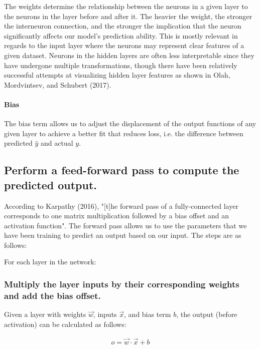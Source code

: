 \documentclass[11pt]{article}
\begin{document}
The weights determine the relationship between the neurons in a given
layer to the neurons in the layer before and after it. The heavier the
weight, the stronger the interneuron connection, and the stronger the
implication that the neuron significantly affects our model's prediction
ability. This is mostly relevant in regards to the input layer where the
neurons may represent clear features of a given dataset. Neurons in the
hidden layers are often less interpretable since they have undergone
multiple transformations, though there have been relatively successful
attempts at visualizing hidden layer features as shown in Olah,
Mordvintsev, and Schubert (2017).

\paragraph{Bias}\label{bias}

The bias term allows us to adjust the displacement of the output
functions of any given layer to achieve a better fit that reduces loss,
i.e. the difference between predicted \(\hat{y}\) and actual \(y\).

    \subsection{Perform a feed-forward pass to compute the predicted
output.}\label{perform-a-feed-forward-pass-to-compute-the-predicted-output.}

According to Karpathy (2016), "{[}t{]}he forward pass of a
fully-connected layer corresponds to one matrix multiplication followed
by a bias offset and an activation function". The forward pass allows us
to use the parameters that we have been training to predict an output
based on our input. The steps are as follows:

For each layer in the network:

\subsubsection{Multiply the layer inputs by their corresponding
weights and add the bias
offset.}\label{multiply-the-layer-inputs-by-their-corresponding-weights-and-add-the-bias-offset.}

Given a layer with weights \(\vec{w}\), inputs \(\vec{x}\), and bias
term \(b\), the output (before activation) can be calculated as follows:

\begin{align*}
o = \vec{w} \cdot \vec{x} + b
\end{align*}
\end{document}
